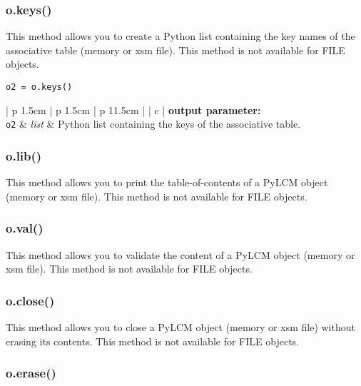 \vskip 0.8cm

\subsubsection{o.keys()}

This method allows you to create a Python list containing the key names of the associative table
(memory or {\sc xsm} file). This method is not available for FILE objects.

\begin{verbatim}
o2 = o.keys()
\end{verbatim}

\noindent
\begin{tabular} {| p {1.5cm} | p {1.5cm} | p {11.5cm} |}
\hline
{} {| c |} {\bf output parameter:} \\
\hline
{\tt o2} & {\it list} & Python list containing the keys of the associative table. \\
\hline
\end{tabular}

\vskip 0.8cm

\subsubsection{o.lib()}

This method allows you to print the table-of-contents of a PyLCM object  (memory or {\sc xsm} file). This method is not available for
FILE objects.

\vskip 0.8cm

\subsubsection{o.val()}

This method allows you to validate the content of a PyLCM object (memory or {\sc xsm} file). This method is not available for
FILE objects.

\vskip 0.8cm

\subsubsection{o.close()}

This method allows you to close a PyLCM object (memory or {\sc xsm} file) without erasing its contents. This method is not available for
FILE objects.

\vskip 0.8cm

\subsubsection{o.erase()}

